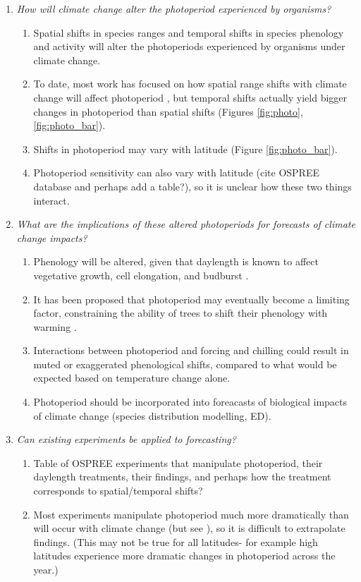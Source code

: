 \documentclass{article}
\begin{document}
\begin{enumerate}
\item\textit{How will climate change alter the photoperiod experienced by organisms?}
\begin{enumerate}
\item Spatial shifts in species ranges and temporal shifts in species phenology and activity will alter the photoperiods experienced by organisms under climate change.
\item  To date, most work has focused on how spatial range shifts with climate change will affect photoperiod \citep{saikkonen2012}, but temporal shifts actually yield bigger changes in photoperiod than spatial shifts  (Figures \ref{fig:photo},\ref{fig:photo_bar}).
\item Shifts in photoperiod may vary with latitude (Figure \ref{fig:photo_bar}). 
\item Photoperiod sensitivity can also vary with latitude (cite OSPREE database and perhaps add a table?), so it is unclear how these two things interact.
\end{enumerate}
\item\textit{What are the implications of these altered photoperiods for forecasts of climate change impacts?}
\begin{enumerate}
\item Phenology will be altered, given that daylength is known to affect vegetative growth, cell elongation, and budburst \citep{linkosalo2006,erwin1998,sidaway2010, hsu2011}.
\item It has been proposed that photoperiod may eventually become a limiting factor, constraining the ability of trees to shift their phenology with warming \citep{koerner2010,vitasse2013, morin2010}. 
\item Interactions between photoperiod and forcing and chilling could result in muted or exaggerated phenological shifts, compared to what would be expected based on temperature change alone.
\item Photoperiod should be incorporated into foreacasts of biological impacts of climate change (species distribution modelling, ED).
\end{enumerate}
\item\textit{Can existing experiments be applied to forecasting?}
\begin{enumerate}
\item Table of OSPREE experiments that manipulate photoperiod, their daylength treatments, their findings, and perhaps how the treatment corresponds to spatial/temporal shifts?
\item Most experiments manipulate photoperiod much more dramatically than will occur with climate change (but see \citep{basler2012}), so it is difficult to extrapolate findings. (This may not be true for all latitudes- for example high latitudes experience more dramatic changes in photoperiod across the year.)

\end{enumerate}
\end{enumerate}
\end{document}
